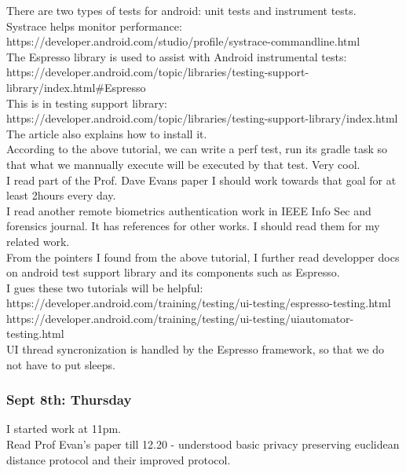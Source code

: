 \documentclass[11pt]{article}
\begin{document}
There are two types of tests for android: unit tests and instrument tests.\\

Systrace helps monitor performance: https://developer.android.com/studio/profile/systrace-commandline.html\\

The Espresso library is used to assist with Android instrumental tests: 
https://developer.android.com/topic/libraries/testing-support-library/index.html#Espresso\\

This is in testing support library: https://developer.android.com/topic/libraries/testing-support-library/index.html\\
The article also explains how to install it.\\

According to the above tutorial, we can write a perf test, run its gradle task so that what we mannually execute will be executed by that test. Very 
cool.\\

I read part of the Prof. Dave Evans paper I should work towards that goal for at least 2hours every day.\\
I read another remote biometrics authentication work in IEEE Info Sec and forensics journal. It has references for other works. I should read them 
for my related work.\\

From the pointers I found from the above tutorial, I further read developper docs on android test support library and its components such as 
Espresso.\\
I gues these two tutorials will be helpful: \\
https://developer.android.com/training/testing/ui-testing/espresso-testing.html\\
https://developer.android.com/training/testing/ui-testing/uiautomator-testing.html\\

UI thread syncronization is handled by the Espresso framework, so that we do not have to put sleeps.\\

\subsubsection*{Sept 8th: Thursday}
I started work at 11pm. \\

Read Prof Evan's paper till 12.20 - understood basic privacy preserving euclidean distance protocol and their improved protocol.\\
\end{document}
